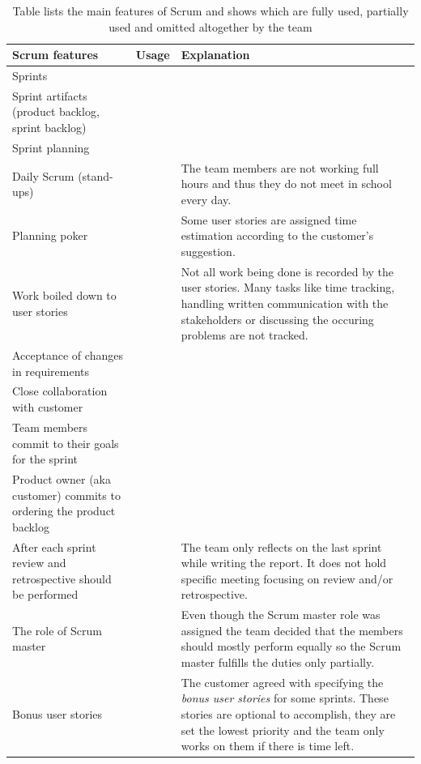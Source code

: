 \begin{table}[!h]
	\begin{center}
	\caption[Main Scrum features]{Table lists the main features of Scrum and shows which are fully used, partially used and omitted altogether by the team}
	\label{tab:scrumbut}
	\def\arraystretch{1.2}
		\begin{tabularx}{1.0\textwidth}{ X c X }
		\toprule[0.5mm]
		\textbf{Scrum features} & \textbf{Usage} & \textbf{Explanation} \\
		\midrule
		Sprints 											& \tick			& 	 	\\
		Sprint artifacts (product backlog, sprint backlog)	& \tick			& 	 	\\
		Sprint planning 									& \tick			& 	 	\\
		Daily Scrum (stand-ups)								& \tickorange	& The team members are not working full hours and thus they do not meet in school every day. \\
		Planning poker 										& \tickorange 	& Some user stories are assigned time estimation according to the customer's suggestion.		\\
		Work boiled down to user stories 					& \tickorange   & Not all work being done is recorded by the user stories. Many tasks like time tracking, handling written communication with the stakeholders or discussing the occuring problems are not tracked. \\
		Acceptance of changes in requirements				& \tick 		& 		\\
		Close collaboration with customer					& \tick 		& 		\\
		Team members commit to their goals for the sprint	& \tick 		& 		\\
		Product owner (aka customer) commits to ordering the product backlog & \tick & \\
		After each sprint review and retrospective should be performed & \cross & The team only reflects on the last sprint while writing the report. It does not hold specific meeting focusing on review and/or retrospective. \\
		The role of Scrum master							& \cross 		& Even though the Scrum master role was assigned the team decided that the members should mostly perform equally so the Scrum master fulfills the duties only partially. \\
		\midrule
		Bonus user stories									& \plus			& The customer agreed with specifying the \textit{bonus user stories} for some sprints. These stories are optional to accomplish, they are set the lowest priority and the team only works on them if there is time left. \\
		\bottomrule[0.5mm]
		\end{tabularx}
	\end{center}
\end{table}

